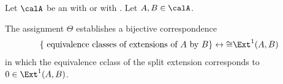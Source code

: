 \begin{theorem} \label{theorem:ext_one_corresponds_to_equivalence_classes_of_extensions}
    Let $\calA$ be an  with  or with . Let $A,B \in \calA$.

    The assignment $\Theta$ establishes a bijective correspondence
    $$\{\text{ equivalence classes of extensions of } A \text{ by } B \} \leftrightarrow{\cong} \Ext^1(A,B)$$
    in which the equivalence cclass of the split extension corresponds to $0 \in \Ext^1(A,B)$.
\end{theorem}